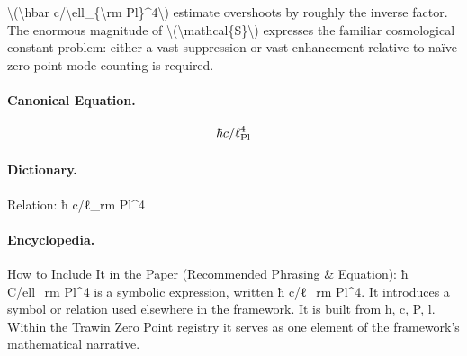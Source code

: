 \textbackslash{}(\textbackslash{}hbar c/\textbackslash{}ell\_\{\textbackslash{}rm Pl\}\textasciicircum{}4\textbackslash{}) estimate overshoots by roughly the inverse factor. The enormous magnitude of \textbackslash{}(\textbackslash{}mathcal\{S\}\textbackslash{}) expresses the familiar cosmological constant problem: either a vast suppression or vast enhancement relative to naïve zero-point mode counting is required.

\paragraph{Canonical Equation.}
\[
\hbar c/\ell_{\rm Pl}^4
\]

\paragraph{Dictionary.}
Relation: ħ c/ℓ\_rm Pl\textasciicircum{}4

\paragraph{Encyclopedia.}
How to Include It in the Paper (Recommended Phrasing \& Equation): ħ C/ell\_rm Pl\textasciicircum{}4 is a symbolic expression, written ħ c/ℓ\_rm Pl\textasciicircum{}4. It introduces a symbol or relation used elsewhere in the framework. It is built from ħ, c, P, l. Within the Trawin Zero Point registry it serves as one element of the framework's mathematical narrative.
